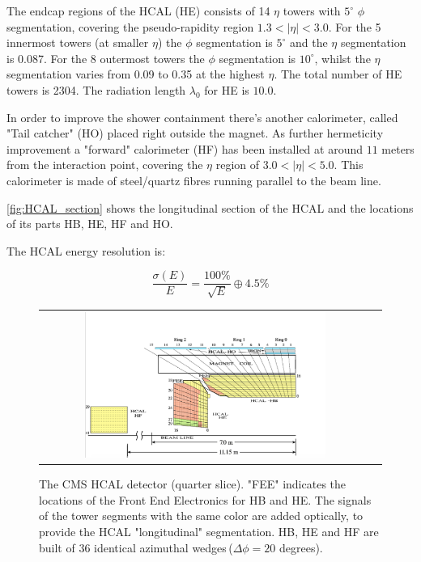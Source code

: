 The endcap regions of the HCAL (HE) consists of 14 $\eta$ towers with $5^{\circ}$ $\phi$ segmentation, covering the pseudo-rapidity region $1.3 < |\eta| < 3.0$. For the 5 innermost towers (at smaller $\eta$) the $\phi$ segmentation is $5^{\circ}$ and the $\eta$ segmentation is 0.087. For the 8 outermost towers the $\phi$ segmentation is $10^{\circ}$, whilst the $\eta$ segmentation varies from 0.09 to 0.35 at the highest $\eta$. The total number of HE towers is 2304. The radiation length $\lambda_{0}$ for HE is $10.0$.

In order to improve the shower containment there's another calorimeter, called "Tail catcher" (HO) placed right outside the magnet. As further hermeticity improvement a "forward" calorimeter (HF) has been installed at around $11$ meters from the interaction point, covering the $\eta$ region of $3.0 < |\eta| <5.0$. This calorimeter is made of steel/quartz fibres running parallel to the beam line.

\autoref{fig:HCAL_section} shows the longitudinal section of the HCAL and the locations of its parts HB, HE, HF and HO.

The HCAL energy resolution is:

\begin{equation}
\dfrac{\sigma(E)}{E} = \dfrac{100\%}{\sqrt{E}}\oplus 4.5\%
\end{equation}

\begin{figure}[tbh!]
	\centering
	\begin{tabular}{cc}
		\includegraphics[width=0.75\textwidth]{detector/pics/HCAL_section.png}
	\end{tabular}
	\caption{The CMS HCAL detector (quarter slice). "FEE" indicates the locations of the Front End Electronics for HB and HE. The signals of the tower segments with the same color are added optically, to provide the HCAL "longitudinal" segmentation. HB, HE and HF are built of 36 identical azimuthal wedges\,($\Delta\phi = 20$ degrees).}
	\label{fig:HCAL_section}
\end{figure}

